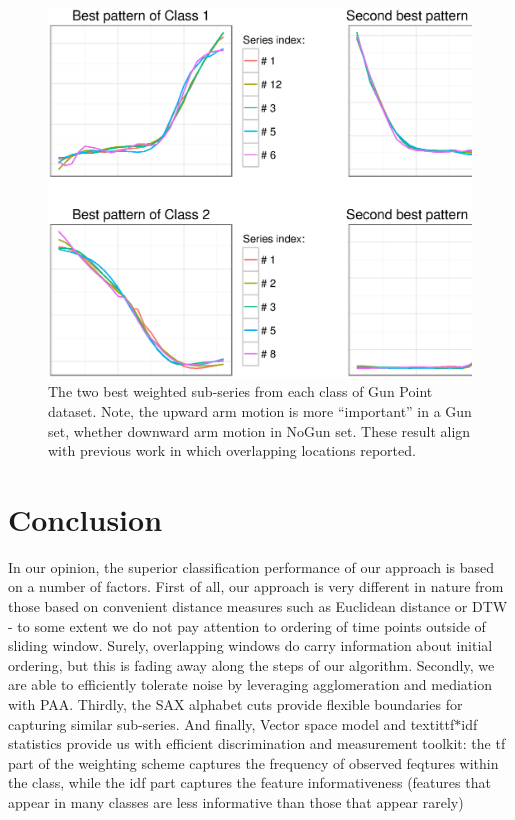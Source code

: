 \documentclass{llncs}
\begin{document}
\begin{figure}[tbp]
   \centering
   \includegraphics[width=130mm]{figures/shapelet-patterns.ps}
   \caption{The two best weighted sub-series from each class of Gun Point dataset. 
   Note, the upward arm motion is more ``important'' in a Gun set, whether downward arm motion in
   NoGun set. These result align with previous work \cite{shapelet} \cite{bagnal} in which 
   overlapping locations reported.
}
   \label{fig:shapelet-like-patterns}
\end{figure}

\section{Conclusion}
In our opinion, the superior classification performance of our approach is based on 
a number of factors. 
First of all, our approach is very different in nature from those 
based on convenient distance measures such as Euclidean distance or DTW - to some 
extent we do not pay attention to ordering of time points outside of sliding window. 
Surely, overlapping windows do carry information about initial ordering, but this 
is fading away along the steps of our algorithm.
Secondly, we are able to efficiently tolerate noise by leveraging agglomeration 
and mediation with PAA. 
Thirdly, the SAX alphabet cuts provide flexible boundaries for capturing similar 
sub-series. 
And finally, Vector space model and textit{tf$\ast$idf} statistics provide us 
with efficient discrimination and measurement toolkit: the tf part of the weighting scheme
captures the frequency of observed feqtures within the class, while the idf part 
captures the feature informativeness (features that appear in many classes 
are less informative than those that appear rarely)
\end{document}
